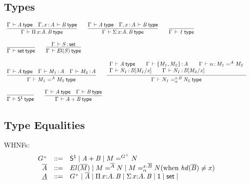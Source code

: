 \subsection{Types}

\begin{small}
\[
\begin{array}{l}
\infer{\wftp{\Gamma}{\picl{x}{A}{B}}}
      {\wftp{\Gamma}{A} & \wftp{\Gamma,\tptm{x}{A}}{B}}
\qquad
\infer{\wftp{\Gamma}{\sigmacl{x}{A}{B}}}
      {\wftp{\Gamma}{A} & \wftp{\Gamma,\tptm{x}{A}}{B}}
\qquad
\infer{\wftp{\Gamma}{1}}{}
\\ \\ 
\infer{\wftp{\Gamma}{\set}}{}
\qquad
\infer{\wftp{\Gamma}{\el{S}}}{\oftp{\Gamma}{S}{\set}}
\\ \\
\infer{\wftp{\Gamma}{\iid{A}{M_1}{M_2}}}
      {\wftp{\Gamma}{A} &
       \oftp{\Gamma}{M_1}{A} & 
       \oftp{\Gamma}{M_2}{A}}
\qquad
\infer{\wftp{\Gamma}{\iidover{x.B}{\alpha}{N_1}{N_2}}}
      {\begin{array}{l}
       \wftp{\Gamma}{A} \qquad
       \oftp{\Gamma}{\{M_1,M_2\}}{A}  \qquad
       \oftp{\Gamma}{\alpha}{\iid{A}{M_1}{M_2}} \\ 
       \oftp{\Gamma}{N_1}{\subst{B}{M_1}{x}} \qquad
       \oftp{\Gamma}{N_1}{\subst{B}{M_2}{x}} 
        \end{array}
        }
\\ \\
\infer{\wftp{\Gamma}{\sone}}{}
\qquad
\infer{\wftp{\Gamma}{\sm{A}{B}}}{\wftp{\Gamma}{A} & \wftp{\Gamma}{B}}
\end{array}
\]
\end{small}

\subsection{Type Equalities}

\newcommand{\whnf}[1]{\ensuremath{\underbar{\ensuremath{#1}}}}
\newcommand{\neu}[1]{\ensuremath{\overline{\ensuremath{#1}}}}
\newcommand{\hd}[1]{\ensuremath{\mathit{hd}(#1)}}
\newcommand{\equivset}[2]{\ensuremath{#1 \cong #2}}

WHNFs:
\[
\begin{array}{rcl}
G\ep & ::= & {\sone} \mid \sm{A}{B} \mid {\iid{G\ep}{M}{N}} \\
\neu{A}  & ::= & \el{\neu{M}} \mid \iid{\neu{A}}{M}{N} \mid {\iidover{x.\neu{B}}{\alpha}{M}{N}} \text{(when $\hd{\neu B} \neq x$)} \\
\whnf{A} & ::= & G\ep \mid \neu{A} \mid \picl{x}{A}{B} \mid \sigmacl{x}{A}{B} \mid \unit \mid \set \mid \\
\end{array}
\]

